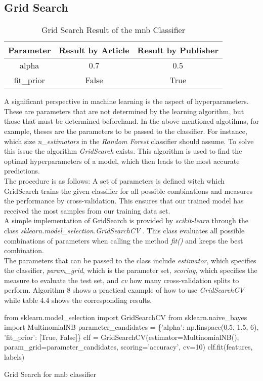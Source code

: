 \documentclass[a4paper, 11pt,titlepage,oneside,openany]{book}
\begin{document}
\subsection{Grid Search}
\begin{table}[h]
	\centering
		\begin{tabular}{c|c|c}
			\toprule
			Parameter & Result by Article & Result by Publisher \\
			\midrule
			alpha & 0.7 & 0.5  \\
			fit\_prior & False & True \\
			\bottomrule
		\end{tabular}
		\caption{Grid Search Result of the \gls{mnb} Classifier}
\end{table}
\noindent A significant perspective in machine learning is the aspect of hyperparameters. These are parameters that are not determined by the learning algorithm, but those that must be determined beforehand. In the above mentioned algotihms, for example, theses are the parameters to be passed to the classifier. For instance, which size \textit{n\_estimators} in the \textit{Random Forest} classifier should assume. To solve this issue the algorithm \textit{GridSearch} exists. This algorithm is used to find the optimal hyperparameters of a model, which then leads to the most accurate predictions. \\
\noindent The procedure is as follows: A set of parameters is defined witch which GridSearch trains the given classifier for all possible combinations and measures the performance by cross-validation. This ensures that our trained model has received the most samples from our training data set. \\
\noindent A simple implementation of GridSearch is provided by \textit{scikit-learn} through the class \textit{sklearn.model\_selection.GridSearchCV} \cite{codegridsearch}. This class evaluates all possible combinations of parameters when calling the method \textit{fit()} and keeps the best combination. \\
\noindent The parameters that can be passed to the class include \textit{estimator}, which specifies the classifier, \textit{param\_grid}, which is the parameter set, \textit{scoring}, which specifies the measure to evaluate the test set, and \textit{cv} how many cross-validation splits to perform. Algorithm 8 shows a practical example of how to use \textit{GridSearchCV} while table 4.4 shows the corresponding results. \\
\begin{algorithm}[h]
	\DontPrintSemicolon
	from sklearn.model\_selection import GridSearchCV\;
	from sklearn.naive\_bayes import MultinomialNB\;
	\BlankLine
	    parameter\_candidates = \{'alpha': np.linspace(0.5, 1.5, 6), 'fit\_prior': [True, False]\}\;
	    clf = GridSearchCV(estimator=MultinomialNB(), param\_grid=parameter\_candidates, scoring='accuracy', cv=10)\;
	clf.fit(features, labels)\;
	\caption{Grid Search for \gls{mnb} classifier}
\end{algorithm}
\end{document}

